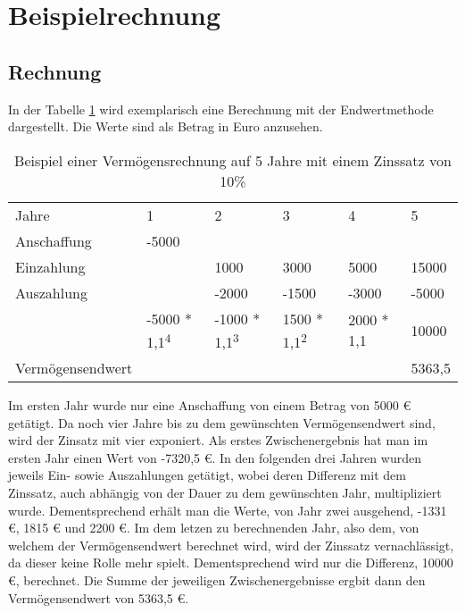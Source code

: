 \section{Beispielrechnung}


\subsection{Rechnung}

In der Tabelle \ref{tb:VermoegensendwertRechnung} wird exemplarisch eine Berechnung mit der Endwertmethode dargestellt. Die Werte sind als Betrag in Euro anzusehen.
\bigskip

\begin{table}[!h]
    \caption{Beispiel einer Vermögensrechnung auf 5 Jahre mit einem Zinssatz von 10\%}
    \begin{tabular}{llllll}
        \cline{1-6} \rowcolor{gray}
        Jahre            & 1                              & 2                              & 3                             & 4          & 5      \\ \cline{1-6} \rowcolor{white}
        Anschaffung      & -5000                          &                                &                               &            &        \\ \cline{1-6} \rowcolor{white}
        Einzahlung       &                                & 1000                           & 3000                          & 5000       & 15000  \\ \cline{1-6} \rowcolor{white}
        Auszahlung       &                                & -2000                          & -1500                         & -3000      & -5000  \\ \cline{1-6} \rowcolor{white}
                         & -5000 * 1,1\textsuperscript{4} & -1000 * 1,1\textsuperscript{3} & 1500 * 1,1\textsuperscript{2} & 2000 * 1,1 & 10000  \\ \rowcolor{white}
        Vermögensendwert &                                &                                &                               &            & 5363,5 \\ \cline{1-6}
    \end{tabular}
    \label{tb:VermoegensendwertRechnung}
\end{table}

\bigskip

\noindent
Im ersten Jahr wurde nur eine Anschaffung von einem Betrag von 5000 € getätigt. Da noch vier Jahre bis zu dem gewünschten Vermögensendwert sind, wird der Zinsatz mit vier exponiert. Als erstes Zwischenergebnis hat man im ersten Jahr einen Wert von -7320,5 €. In den folgenden drei Jahren wurden jeweils Ein- sowie Auszahlungen getätigt, wobei deren Differenz mit dem Zinssatz, auch abhängig von der Dauer zu dem gewünschten Jahr, multipliziert wurde. Dementsprechend erhält man die Werte, von Jahr zwei ausgehend, -1331 €, 1815 € und 2200 €. Im dem letzen zu berechnenden Jahr, also dem, von welchem der Vermögensendwert berechnet wird, wird der Zinssatz vernachlässigt, da dieser keine Rolle mehr spielt. Dementsprechend wird nur die Differenz, 10000 €, berechnet. Die Summe der jeweiligen Zwischenergebnisse ergbit dann den Vermögensendwert von 5363,5 €.

